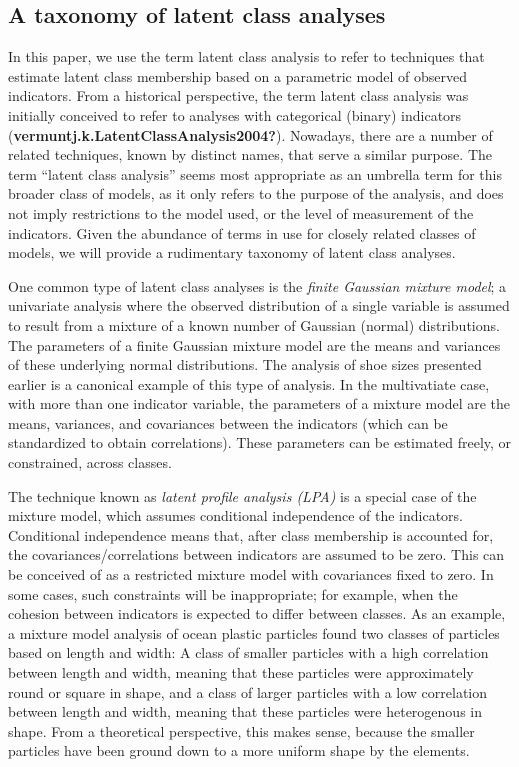 \documentclass[
  ,man]{apa6}
\begin{document}
\hypertarget{a-taxonomy-of-latent-class-analyses}{%
\subsection{A taxonomy of latent class analyses}\label{a-taxonomy-of-latent-class-analyses}}

In this paper, we use the term latent class analysis to refer to techniques that estimate latent class membership based on a parametric model of observed indicators.
From a historical perspective, the term latent class analysis was initially conceived to refer to analyses with categorical (binary) indicators (\textbf{vermuntj.k.LatentClassAnalysis2004?}).
Nowadays, there are a number of related techniques, known by distinct names, that serve a similar purpose.
The term ``latent class analysis'' seems most appropriate as an umbrella term for this broader class of models,
as it only refers to the purpose of the analysis, and does not imply restrictions to the model used, or the level of measurement of the indicators.
Given the abundance of terms in use for closely related classes of models, we will provide a rudimentary taxonomy of latent class analyses.

One common type of latent class analyses is the \emph{finite Gaussian mixture model};
a univariate analysis where the observed distribution of a single variable is assumed to result from a mixture of a known number of Gaussian (normal) distributions.
The parameters of a finite Gaussian mixture model are the means and variances of these underlying normal distributions.
The analysis of shoe sizes presented earlier is a canonical example of this type of analysis.
In the multivatiate case, with more than one indicator variable,
the parameters of a mixture model are the means, variances, and covariances between the indicators (which can be standardized to obtain correlations).
These parameters can be estimated freely, or constrained, across classes.

The technique known as \emph{latent profile analysis (LPA)} is a special case of the mixture model,
which assumes conditional independence of the indicators.
Conditional independence means that,
after class membership is accounted for,
the covariances/correlations between indicators are assumed to be zero.
This can be conceived of as a restricted mixture model with covariances fixed to zero.
In some cases, such constraints will be inappropriate;
for example, when the cohesion between indicators is expected to differ between classes.
As an example, a mixture model analysis of ocean plastic particles found two classes of particles based on length and width:
A class of smaller particles with a high correlation between length and width, meaning that these particles were approximately round or square in shape, and a class of larger particles with a low correlation between length and width, meaning that these particles were heterogenous in shape.
From a theoretical perspective, this makes sense, because the smaller particles have been ground down to a more uniform shape by the elements.
\end{document}
